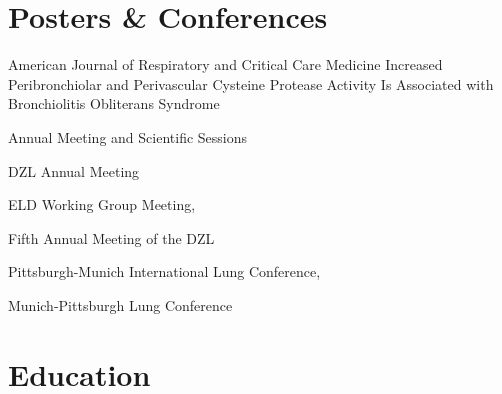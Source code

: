 \documentclass[10pt]{article} %
\begin{document}
\begin{paracol}{2}
\begin{supertabular}{rl}
\end{supertabular}

\section{Posters \& Conferences}
{} %
{American Journal of Respiratory and Critical Care Medicine} %
{} %
{Increased Peribronchiolar and Perivascular Cysteine Protease Activity Is Associated with Bronchiolitis Obliterans Syndrome} %

{} %
{Annual Meeting and Scientific Sessions} %
{} %
{} %

{} %
{DZL Annual Meeting} %
{} %
{} %

{} %
{ELD Working Group Meeting,} %
{} %
{} %

{} %
{Fifth Annual Meeting of the DZL} %
{} %
{} %

{} %
{Pittsburgh-Munich International Lung Conference,} %
{} %
{} %

{} %
{Munich-Pittsburgh Lung Conference} %
{} %
{} %




\section{Education} 


\end{paracol}
\end{document}
